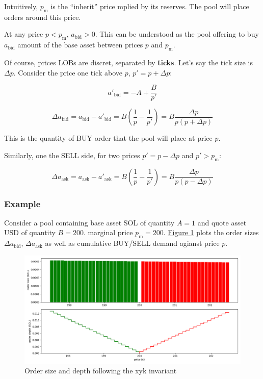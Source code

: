 \documentclass{article}
\begin{document}
Intuitively, $p_{\mathrm{m}}$ is the ``inherit'' price mplied by its reserves. The pool will place orders around this price.

At any price $p < p_{\mathrm{m}}$, $a_{\mathrm{bid}} > 0$. This can be understood as the pool offering to buy $a_{\mathrm{bid}}$ amount of the base asset between prices $p$ and $p_{\mathrm{m}}$.

Of course, prices LOBs are discret, separated by \textbf{ticks}. Let's say the tick size is $\Delta p$. Consider the price one tick above $p$, $p' = p + \Delta p$:

\begin{equation}
  a'_{\mathrm{bid}} = -A + \frac{B}{p'}
\end{equation}

\begin{equation}
  \Delta a_{\mathrm{bid}} = a_{\mathrm{bid}} - a'_{\mathrm{bid}} = B \left(\frac{1}{p} - \frac{1}{p'} \right) = B \frac{\Delta p}{p (p + \Delta p)}
\end{equation}

This is the quantity of BUY order that the pool will place at price $p$.

Similarly, one the SELL side, for two prices $p' = p - \Delta p$ and $p' > p_{\mathrm{m}}$:

\begin{equation}
  \Delta a_{\mathrm{ask}} = a_{\mathrm{ask}} - a'_{\mathrm{ask}} = B \left(\frac{1}{p} - \frac{1}{p'} \right) = B \frac{\Delta p}{p (p - \Delta p)}
\end{equation}

\subsubsection{Example}

Consider a pool containing base asset SOL of quantity $A = 1$ and quote asset USD of quantity $B = 200$. marginal price $p_{\mathrm{m}} = 200$. \hyperref[fig:1]{Figure 1} plots the order sizes $\Delta a_{\mathrm{bid}}$, $\Delta a_{\mathrm{ask}}$ as well as cumulative BUY/SELL demand agianst price $p$.

\begin{figure}
  \includegraphics[width=\textwidth]{1-xyk.png}
  \caption{Order size and depth following the xyk invariant}
  \label{fig:1}
\end{figure}
\end{document}
